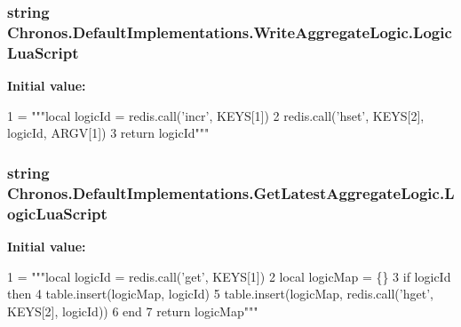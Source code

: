 \subsubsection[{\texorpdfstring{Logic\+Lua\+Script}{LogicLuaScript}}]{\setlength{\rightskip}{0pt plus 5cm}string Chronos.\+Default\+Implementations.\+Write\+Aggregate\+Logic.\+Logic\+Lua\+Script\hspace{0.3cm}{\ttfamily [static]}}\hypertarget{group__Chronos_ga4e58c2df5b346f747a24ca58d9b59063}{}\label{group__Chronos_ga4e58c2df5b346f747a24ca58d9b59063}
{\bfseries Initial value\+:}
\begin{DoxyCode}
1 = \textcolor{stringliteral}{"""local logicId = redis.call('incr', KEYS[1])}
2 \textcolor{stringliteral}{                    redis.call('hset', KEYS[2], logicId, ARGV[1])}
3 \textcolor{stringliteral}{                    return logicId"""}
\end{DoxyCode}
\subsubsection[{\texorpdfstring{Logic\+Lua\+Script}{LogicLuaScript}}]{\setlength{\rightskip}{0pt plus 5cm}string Chronos.\+Default\+Implementations.\+Get\+Latest\+Aggregate\+Logic.\+Logic\+Lua\+Script\hspace{0.3cm}{\ttfamily [static]}}\hypertarget{group__Chronos_ga07c71f416aa762fe35cbace6423ac7f2}{}\label{group__Chronos_ga07c71f416aa762fe35cbace6423ac7f2}
{\bfseries Initial value\+:}
\begin{DoxyCode}
1 = \textcolor{stringliteral}{"""local logicId = redis.call('get', KEYS[1])}
2 \textcolor{stringliteral}{                    local logicMap = \{\}}
3 \textcolor{stringliteral}{                    if logicId then}
4 \textcolor{stringliteral}{                      table.insert(logicMap, logicId)}
5 \textcolor{stringliteral}{                      table.insert(logicMap, redis.call('hget', KEYS[2], logicId))}
6 \textcolor{stringliteral}{                    end}
7 \textcolor{stringliteral}{                    return logicMap"""}
\end{DoxyCode}

